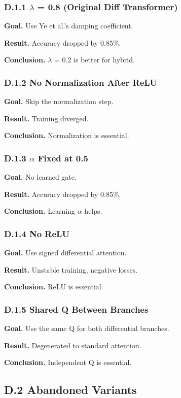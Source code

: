 \subsubsection{D.1.1 $\lambda$ = 0.8 (Original Diff Transformer)}

\textbf{Goal.} Use Ye et al.'s damping coefficient.

\textbf{Result.} Accuracy dropped by 0.85\%.

\textbf{Conclusion.} $\lambda$ = 0.2 is better for hybrid.

\subsubsection{D.1.2 No Normalization After ReLU}

\textbf{Goal.} Skip the normalization step.

\textbf{Result.} Training diverged.

\textbf{Conclusion.} Normalization is essential.

\subsubsection{D.1.3 $\alpha$ Fixed at 0.5}

\textbf{Goal.} No learned gate.

\textbf{Result.} Accuracy dropped by 0.85\%.

\textbf{Conclusion.} Learning $\alpha$ helps.

\subsubsection{D.1.4 No ReLU}

\textbf{Goal.} Use signed differential attention.

\textbf{Result.} Unstable training, negative losses.

\textbf{Conclusion.} ReLU is essential.

\subsubsection{D.1.5 Shared Q Between Branches}

\textbf{Goal.} Use the same Q for both differential branches.

\textbf{Result.} Degenerated to standard attention.

\textbf{Conclusion.} Independent Q is essential.

\subsection{D.2 Abandoned Variants}

